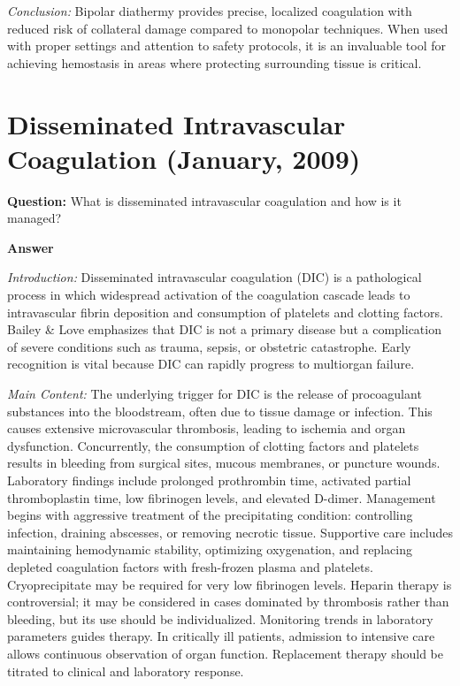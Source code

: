 \documentclass{article}
\begin{document}
\emph{Conclusion:} Bipolar diathermy provides precise, localized coagulation with reduced risk of collateral damage compared to monopolar techniques. When used with proper settings and attention to safety protocols, it is an invaluable tool for achieving hemostasis in areas where protecting surrounding tissue is critical.


\section{Disseminated Intravascular Coagulation (January, 2009)}


\textbf{Question:} What is disseminated intravascular coagulation and how is it managed?

\textbf{Answer}

\emph{Introduction:} Disseminated intravascular coagulation (DIC) is a pathological process in which widespread activation of the coagulation cascade leads to intravascular fibrin deposition and consumption of platelets and clotting factors. Bailey \& Love emphasizes that DIC is not a primary disease but a complication of severe conditions such as trauma, sepsis, or obstetric catastrophe. Early recognition is vital because DIC can rapidly progress to multiorgan failure.

\emph{Main Content:} The underlying trigger for DIC is the release of procoagulant substances into the bloodstream, often due to tissue damage or infection. This causes extensive microvascular thrombosis, leading to ischemia and organ dysfunction. Concurrently, the consumption of clotting factors and platelets results in bleeding from surgical sites, mucous membranes, or puncture wounds. Laboratory findings include prolonged prothrombin time, activated partial thromboplastin time, low fibrinogen levels, and elevated D-dimer. Management begins with aggressive treatment of the precipitating condition: controlling infection, draining abscesses, or removing necrotic tissue. Supportive care includes maintaining hemodynamic stability, optimizing oxygenation, and replacing depleted coagulation factors with fresh-frozen plasma and platelets. Cryoprecipitate may be required for very low fibrinogen levels. Heparin therapy is controversial; it may be considered in cases dominated by thrombosis rather than bleeding, but its use should be individualized. Monitoring trends in laboratory parameters guides therapy. In critically ill patients, admission to intensive care allows continuous observation of organ function. Replacement therapy should be titrated to clinical and laboratory response.
\end{document}
